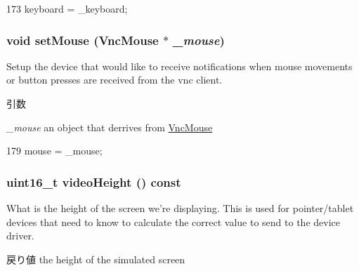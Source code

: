 \begin{DoxyCode}
173 { keyboard = _keyboard; }
\end{DoxyCode}
\hypertarget{classVncInput_a72219b1c8621f5be92c7217c0cea3834}{
\subsubsection[{setMouse}]{\setlength{\rightskip}{0pt plus 5cm}void setMouse ({\bf VncMouse} $\ast$ {\em \_\-mouse})}}
\label{classVncInput_a72219b1c8621f5be92c7217c0cea3834}
Setup the device that would like to receive notifications when mouse movements or button presses are received from the vnc client. 
\begin{DoxyParams}{引数}
\item[{\em \_\-mouse}]an object that derrives from \hyperlink{classVncMouse}{VncMouse} \end{DoxyParams}



\begin{DoxyCode}
179 { mouse = _mouse; }
\end{DoxyCode}
\hypertarget{classVncInput_aba9f8788e70eacd6c454abfe49de9c3c}{
\subsubsection[{videoHeight}]{\setlength{\rightskip}{0pt plus 5cm}uint16\_\-t videoHeight () const}}
\label{classVncInput_aba9f8788e70eacd6c454abfe49de9c3c}
What is the height of the screen we're displaying. This is used for pointer/tablet devices that need to know to calculate the correct value to send to the device driver. \begin{DoxyReturn}{戻り値}
the height of the simulated screen 
\end{DoxyReturn}



